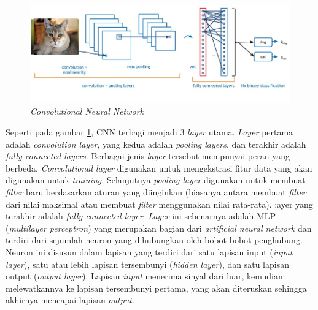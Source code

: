\begin{figure} [ht] \centering
  \includegraphics[scale=0.75]{gambar/cnn.jpg}
  \caption{\emph{Convolutional Neural Network} \cite{GambarCNN}}
  \label{fig:ConvolutionalNeuralNetwork}
\end{figure}

Seperti pada gambar \ref{fig:ConvolutionalNeuralNetwork}, CNN terbagi menjadi 3 \emph{layer} utama. \emph{Layer} pertama adalah \emph{convolution layer}, yang kedua adalah \emph{pooling layers}, dan terakhir adalah \emph{fully connected layers}. Berbagai jenis \emph{layer} tersebut mempunyai peran yang berbeda. \emph{Convolutional layer} digunakan untuk mengekstrasi fitur data yang akan digunakan untuk \emph{training}. Selanjutnya \emph{pooling layer} digunakan untuk membuat \emph{filter} baru berdasarkan aturan yang diinginkan (biasanya antara membuat \emph{filter} dari nilai maksimal atau membuat \emph{filter} menggunakan nilai rata-rata). :ayer yang terakhir adalah \emph{fully connected layer}. \emph{Layer} ini sebenarnya adalah MLP (\emph{multilayer perceptron}) yang merupakan bagian dari \emph{artificial neural network} dan terdiri dari sejumlah neuron yang dihubungkan oleh bobot-bobot penghubung. Neuron ini disusun dalam lapisan yang terdiri dari satu lapisan input (\emph{input layer}), satu atau lebih lapisan tersembunyi (\emph{hidden layer}), dan satu lapisan output (\emph{output layer}). Lapisan \emph{input} menerima sinyal dari luar, kemudian melewatkannya ke lapisan tersembunyi pertama, yang akan diteruskan sehingga akhirnya mencapai lapisan \emph{output}. \cite{CNN}